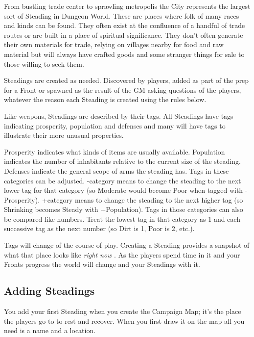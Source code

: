        

From bustling trade center to sprawling metropolis the City represents the largest sort of Steading in Dungeon World. These are places where folk of many races and kinds can be found. They often exist at the confluence of a handful of trade routes or are built in a place of spiritual significance. They don't often generate their own materials for trade, relying on villages nearby for food and raw material but will always have crafted goods and some stranger things for sale to those willing to seek them.

       

Steadings are created as needed. Discovered by players, added as part of the prep for a Front or spawned as the result of the GM asking questions of the players, whatever the reason each Steading is created using the rules below.

       

Like weapons, Steadings are described by their tags. All Steadings have tags indicating prosperity, population and defenses and many will have tags to illustrate their more unusual properties.

       

Prosperity indicates what kinds of items are usually available. Population indicates the number of inhabitants relative to the current size of the steading. Defenses indicate the general scope of arms the steading has. Tags in these categories can be adjusted. -category means to change the steading to the next lower tag for that category (so Moderate would become Poor when tagged with -Prosperity). +category means to change the steading to the next higher tag (so Shrinking becomes Steady with +Population). Tags in those categories can also be compared like numbers. Treat the lowest tag in that category as 1 and each successive tag as the next number (so Dirt is 1, Poor is 2, etc.).

       

Tags will change of the course of play. Creating a Steading provides a snapshot of what that place looks like {\em right now} . As the players spend time in it and your Fronts progress the world will change and your Steadings with it.

       
\subsection{Adding Steadings}   
       

You add your first Steading when you create the Campaign Map; it's the place the players go to to rest and recover. When you first draw it on the map all you need is a name and a location.

